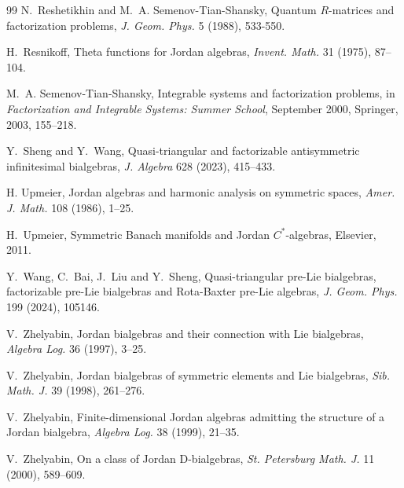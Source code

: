 \documentclass[12pt, reqno, a4paper]{amsart}
\theoremstyle{definition}
\begin{document}
\begin{thebibliography}{99}
	N.~Reshetikhin and M.~A. Semenov-Tian-Shansky, Quantum $R$-matrices and factorization problems, \textit{J. Geom. Phys.} 5 (1988), 533-550.
	

	H.~Resnikoff, Theta functions for Jordan algebras, \textit{Invent. Math.} 31 (1975), 87--104.
	
	M.~A. Semenov-Tian-Shansky, Integrable systems and factorization problems, in \textit{Factorization and Integrable Systems: Summer School}, September 2000, Springer, 2003, 155--218.
	
	Y.~Sheng and Y.~Wang, Quasi-triangular and factorizable antisymmetric infinitesimal bialgebras, \textit{J. Algebra} 628 (2023), 415--433.
	
	H. Upmeier, Jordan algebras and harmonic analysis on symmetric spaces, \textit{Amer. J. Math.} 108 (1986), 1--25.
	
	H.~Upmeier, Symmetric Banach manifolds and Jordan $C^*$-algebras, Elsevier, 2011.
	
	Y.~Wang, C.~Bai, J.~Liu and Y.~Sheng, Quasi-triangular pre-{Lie} bialgebras, factorizable pre-Lie bialgebras and Rota-Baxter pre-Lie algebras, \textit{J. Geom. Phys.} 199 (2024), 105146.
	

	V.~Zhelyabin, Jordan bialgebras and their connection with Lie bialgebras, \textit{Algebra Log.} 36 (1997), 3--25.

	
	V.~Zhelyabin, Jordan bialgebras of symmetric elements and Lie bialgebras, \textit{Sib. Math. J.} 39 (1998), 261--276.

	V.~Zhelyabin, Finite-dimensional Jordan algebras admitting the structure of a Jordan bialgebra, \textit{Algebra Log.} 38 (1999), 21--35.

	V.~Zhelyabin, On a class of Jordan D-bialgebras, \textit{St. Petersburg Math. J.} 11 (2000), 589--609.


\end{thebibliography}
\end{document}

